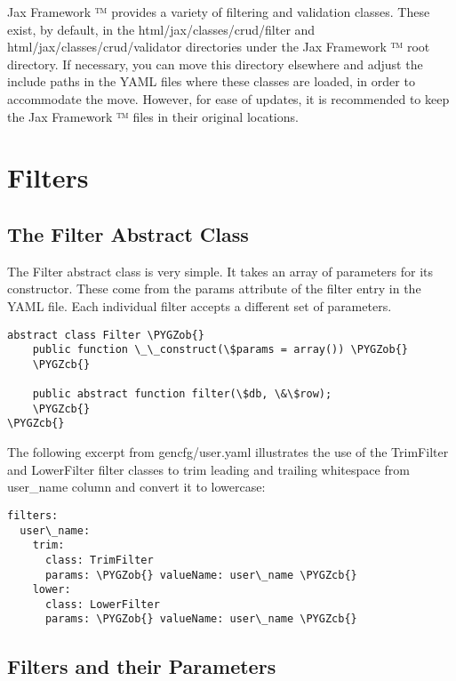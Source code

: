 \documentclass[letterpaper,10pt,english]{sphinxmanual}
\def\PYGZob{\char`\{}
\def\PYGZcb{\char`\}}
\begin{document}
Jax Framework ™ provides a variety of filtering and validation classes.  These exist, by
default, in the html/jax/classes/crud/filter and html/jax/classes/crud/validator directories under
the Jax Framework ™ root directory.  If necessary, you can move this directory elsewhere and
adjust the include paths in the YAML files where these classes are loaded, in order to accommodate
the move.  However, for ease of updates, it is recommended to keep the Jax Framework ™ files
in their original locations.


\section{Filters}
\label{jaxFrameworkGuide:filters}

\subsection{The Filter Abstract Class}
\label{jaxFrameworkGuide:the-filter-abstract-class}
The Filter abstract class is very simple.  It takes an array of parameters for its constructor.
These come from the params attribute of the filter entry in the YAML file.  Each individual filter
accepts a different set of parameters.

\begin{Verbatim}[commandchars=\\\{\}]
abstract class Filter \PYGZob{}
    public function \_\_construct(\$params = array()) \PYGZob{}
    \PYGZcb{}

    public abstract function filter(\$db, \&\$row);
    \PYGZcb{}
\PYGZcb{}
\end{Verbatim}

The following excerpt from gencfg/user.yaml illustrates the use of the TrimFilter and LowerFilter
filter classes to trim leading and trailing whitespace from user\_name column and convert it to
lowercase:

\begin{Verbatim}[commandchars=\\\{\}]
filters:
  user\_name:
    trim:
      class: TrimFilter
      params: \PYGZob{} valueName: user\_name \PYGZcb{}
    lower:
      class: LowerFilter
      params: \PYGZob{} valueName: user\_name \PYGZcb{}
\end{Verbatim}


\subsection{Filters and their Parameters}
\label{jaxFrameworkGuide:filters-and-their-parameters}
\end{document}
